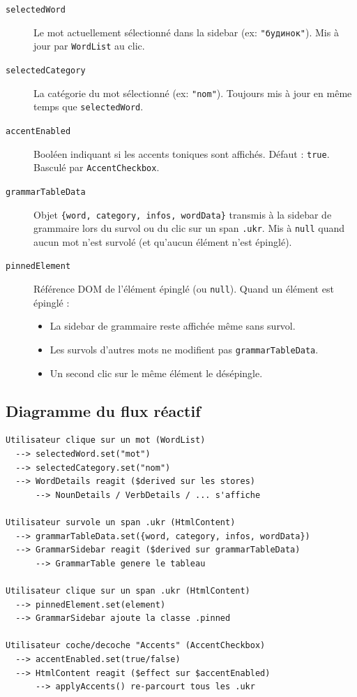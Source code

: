 \begin{description}
  \item[\texttt{selectedWord}] Le mot actuellement sélectionné dans la sidebar (ex: \texttt{"будинок"}). Mis à jour par \texttt{WordList} au clic.

  \item[\texttt{selectedCategory}] La catégorie du mot sélectionné (ex: \texttt{"nom"}). Toujours mis à jour en même temps que \texttt{selectedWord}.

  \item[\texttt{accentEnabled}] Booléen indiquant si les accents toniques sont affichés. Défaut : \texttt{true}. Basculé par \texttt{AccentCheckbox}.

  \item[\texttt{grammarTableData}] Objet \texttt{\{word, category, infos, wordData\}} transmis à la sidebar de grammaire lors du survol ou du clic sur un span \texttt{.ukr}. Mis à \texttt{null} quand aucun mot n'est survolé (et qu'aucun élément n'est épinglé).

  \item[\texttt{pinnedElement}] Référence DOM de l'élément épinglé (ou \texttt{null}). Quand un élément est épinglé :
  \begin{itemize}
    \item La sidebar de grammaire reste affichée même sans survol.
    \item Les survols d'autres mots ne modifient pas \texttt{grammarTableData}.
    \item Un second clic sur le même élément le désépingle.
  \end{itemize}
\end{description}

\subsection{Diagramme du flux réactif}

\begin{lstlisting}[title=Flux des stores dans l'application]
Utilisateur clique sur un mot (WordList)
  --> selectedWord.set("mot")
  --> selectedCategory.set("nom")
  --> WordDetails reagit ($derived sur les stores)
      --> NounDetails / VerbDetails / ... s'affiche

Utilisateur survole un span .ukr (HtmlContent)
  --> grammarTableData.set({word, category, infos, wordData})
  --> GrammarSidebar reagit ($derived sur grammarTableData)
      --> GrammarTable genere le tableau

Utilisateur clique sur un span .ukr (HtmlContent)
  --> pinnedElement.set(element)
  --> GrammarSidebar ajoute la classe .pinned

Utilisateur coche/decoche "Accents" (AccentCheckbox)
  --> accentEnabled.set(true/false)
  --> HtmlContent reagit ($effect sur $accentEnabled)
      --> applyAccents() re-parcourt tous les .ukr
\end{lstlisting}
